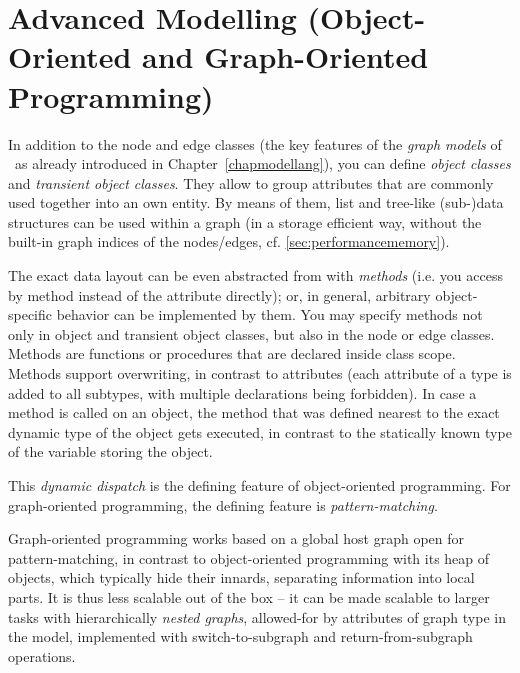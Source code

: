 \chapter{Advanced Modelling (Object-Oriented and Graph-Oriented Programming)}
\label{cha:modeladvanced}


In addition to the node and edge classes (the key features of the \emph{graph models} of \GrG\ as already introduced in Chapter~\ref{chapmodellang}),
you can define \emph{object classes} and \emph{transient object classes}.
They allow to group attributes that are commonly used together into an own entity.
By means of them, list and tree-like (sub-)data structures can be used within a graph (in a storage efficient way, without the built-in graph indices of the nodes/edges, cf. \ref{sec:performancememory}).

The exact data layout can be even abstracted from with \emph{methods} (i.e. you access by method instead of the attribute directly); or, in general, arbitrary object-specific behavior can be implemented by them.
You may specify methods not only in object and transient object classes, but also in the node or edge classes.
Methods are functions or procedures that are declared inside class scope.
Methods support overwriting, in contrast to attributes (each attribute of a type is added to all subtypes, with multiple declarations being forbidden).
In case a method is called on an object, the method that was defined nearest to the exact dynamic type of the object gets executed, in contrast to the statically known type of the variable storing the object.

This \emph{dynamic dispatch} is the defining feature of object-oriented programming.
For graph-oriented programming, the defining feature is \emph{pattern-matching}.

Graph-oriented programming works based on a global host graph open for pattern-matching, in contrast to object-oriented programming with its heap of objects, which typically hide their innards, separating information into local parts. 
It is thus less scalable out of the box -- it can be made scalable to larger tasks with hierarchically \emph{nested graphs}, allowed-for by attributes of graph type in the model, implemented with switch-to-subgraph and return-from-subgraph operations.

